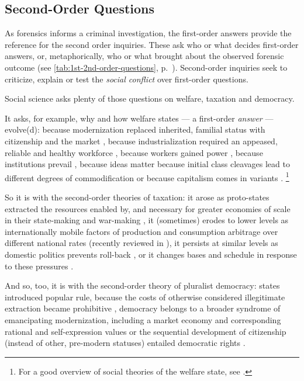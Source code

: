 \subsection{Second-Order Questions}
	\label{sec:2nd-questions}
As forensics informs a criminal investigation, the first-order answers provide the reference for the second order inquiries.
These ask who or what decides first-order answers, or, metaphorically, who or what brought about the observed forensic outcome (see \autoref{tab:1st-2nd-order-questions}, p.~\pageref{tab:1st-2nd-order-questions}).
Second-order inquiries seek to criticize, explain or test the \emph{social conflict} over first-order questions.

Social science asks plenty of those questions on welfare, taxation and democracy.

It asks, for example, why and how welfare states --- a first-order \emph{answer} --- evolve(d):
because modernization replaced inherited, familial status with citizenship and the market \citep{Titmuss1974,Marshall-1950-aa}, because industrialization required an appeased, reliable and healthy workforce \citep{Flora1981,Wilensky1975}, because workers gained power \citep{Korpi1983,Jessop2002}, because institutions prevail \citep[for example,][]{Rothstein}, because ideas matter \citep[for example,][]{Stiller2009} because initial class cleavages lead to different degrees of commodification \citep{Esping-Andersen-1990-aa} or because capitalism comes in variants \citep{HallSoskice-2001-aa}.
\footnote{
	For a good overview of social theories of the welfare state, see \cite{BrooksManza2007} %
	.
}

So it is with the second-order theories of taxation:
it arose as proto-states extracted the resources enabled by, and necessary for greater economies of scale in their state-making and war-making \citep{Tilly-1985-aa}, it (sometimes) erodes to lower levels as internationally mobile factors of production and consumption arbitrage over different national rates (recently reviewed in \citealt{Genschel2010}), it persists at similar levels as domestic politics prevents roll-back \citep{Swank2002}, or it changes bases and schedule in response to these pressures \citep{Kemmerling2009}.

And so, too, it is with the second-order theory of pluralist democracy:
states introduced popular rule, because the costs of otherwise considered illegitimate extraction became prohibitive \citep{Tilly2006}, democracy belongs to a broader syndrome of emancipating modernization, including a market economy and corresponding rational and self-expression values \citep{InglehartWelzel-2005-aa} or the sequential development of citizenship (instead of other, pre-modern statuses) entailed democratic rights \citep{Marshall-1950-aa}.


